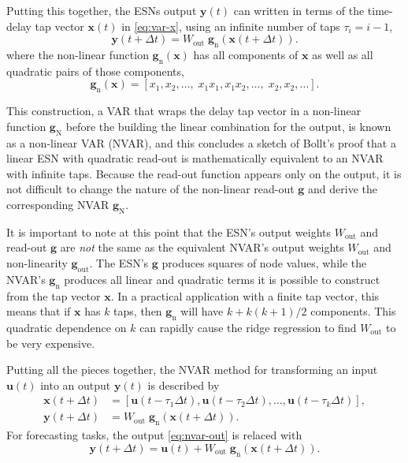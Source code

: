 Putting this together, the ESNs output $\bm{y}(t)$ can written in
terms of the time-delay tap vector $\bm{x}(t)$ in \cref{eq:var-x},
using an infinite number of taps $\tau_i = i - 1$,
\begin{equation}
  \bm{y}(t + \Delta t) = W_\text{out}\;\bm{g}_\text{n}\left(\bm{x}(t + \Delta t)\right).
\end{equation}
where the non-linear function $\bm{g}_\text{n}(\bm{x})$ has all
components of $\bm{x}$ as well as all quadratic pairs of those components,
\begin{equation}
  \label{eq:quadratic-nvar}
  \bm{g}_\text{n}(\bm{x}) = [x_1, x_2, \dots, \; x_1 x_1, x_1 x_2, \dots, \; x_2, x_2, \dots].
\end{equation}

This construction, a VAR that wraps the delay tap vector in a
non-linear function $\bm{g}_\text{N}$ before the building the linear
combination for the output, is known as a non-linear VAR (NVAR), and
this concludes a sketch of Bollt's proof that a linear ESN with
quadratic read-out is mathematically equivalent to an NVAR with
infinite taps\cite{bollt2021}. Because the read-out function appears
only on the output, it is not difficult to change the nature of the
non-linear read-out $\bm{g}$ and derive the corresponding NVAR
$\bm{g}_\text{N}$.

It is important to note at this point that the ESN's output weights
$W_\text{out}$ and read-out $\bm{g}$ are \emph{not} the same as the
equivalent NVAR's output weights $W_\text{out}$ and non-linearity
$\bm{g}_\text{out}$. The ESN's $\bm{g}$ produces squares of node
values, while the NVAR's $\bm{g}_\text{n}$ produces all linear and
quadratic terms it is possible to construct from the tap vector
$\bm{x}$. In a practical application with a finite tap vector, this
means that if $\bm{x}$ has $k$ taps, then $\bm{g}_\text{n}$ will have
$k + k(k+1)/2$ components. This quadratic dependence on $k$ can
rapidly cause the ridge regression to find $W_\text{out}$ to be very
expensive.

Putting all the pieces together, the NVAR method for transforming an
input $\bm{u}(t)$ into an output $\bm{y}(t)$ is described by
\begin{align}
  \label{eq:nvar}
  \bm{x}(t + \Delta t) &= [\bm{u}(t - \tau_1 \Delta t), \bm{u}(t - \tau_2 \Delta t), \dots, \bm{u}(t - \tau_k \Delta t)], \\
  \label{eq:nvar-out}
  \bm{y}(t + \Delta t) &= W_\text{out}\;\bm{g}_\text{n}\left(\bm{x}(t + \Delta t)\right).
\end{align}
For forecasting tasks, the output \cref{eq:nvar-out} is relaced with
\begin{equation}
  \label{eq:nvar-out-forecast}
  \bm{y}(t + \Delta t) = \bm{u}(t) + W_\text{out}\;\bm{g}_\text{n}\left(\bm{x}(t + \Delta t)\right).
\end{equation}

